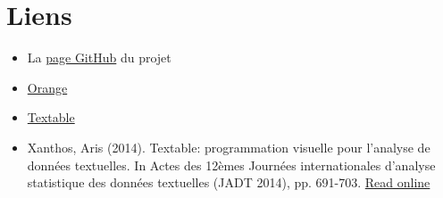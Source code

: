 \documentclass{article}
\begin{document}
\section{Liens}

\begin{itemize}
    \item La \href{https://github.com/johancuda/rapport_projet_ISH_MA}{page GitHub} du projet
    \item \href{https://orangedatamining.com/}{Orange}
    \item \href{http://textable.io/}{Textable}
    \item Xanthos, Aris (2014). Textable: programmation visuelle pour l’analyse de données textuelles. In Actes des 12èmes Journées internationales d’analyse statistique des données textuelles (JADT 2014), pp. 691-703. \href{http://lexicometrica.univ-paris3.fr/jadt/jadt2014/01-ACTES/57-JADT2014.pdf}{Read online}
\end{itemize}
\end{document}
